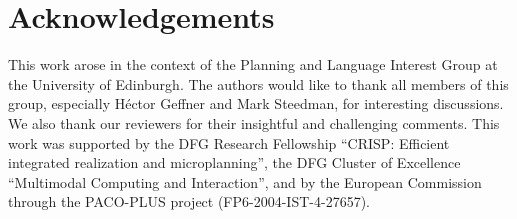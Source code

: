 \section*{Acknowledgements}

This work arose in the context of the Planning and Language Interest
Group at the University of Edinburgh. The authors would like to thank
all members of this group, especially H{\'{e}}ctor Geffner and Mark
Steedman, for interesting discussions. We also thank our reviewers for
their insightful and challenging comments.  This work was supported by
the DFG Research Fellowship ``CRISP: Efficient integrated realization
and microplanning'', the DFG Cluster of Excellence ``Multimodal
Computing and Interaction'', and by the European Commission through
the PACO-PLUS project (FP6-2004-IST-4-27657).


